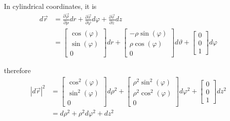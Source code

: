 \documentclass[11pt,a4paper]{article}
\begin{document}
\begin{enumerate}
In cylindrical coordinates, it is
\begin{align*}
d\vec{r}
&=\frac{\partial\vec{\rho}}{\partial \rho}dr+\frac{\partial\vec{r}}{\partial \varphi}d\varphi+\frac{\partial\vec{r}}{\partial z}dz \\
&=
\begin{bmatrix}
\cos(\varphi) \\
\sin(\varphi) \\
0
\end{bmatrix}
dr
+
\begin{bmatrix}
-\rho\sin(\varphi) \\
\rho\cos(\varphi) \\
0
\end{bmatrix}
d\vartheta
+
\begin{bmatrix}
0 \\
0 \\
1
\end{bmatrix}
d\varphi
\end{align*}

therefore
\begin{align*}
|d\vec{r}|^2
&=
\begin{bmatrix}
\cos^2(\varphi) \\
\sin^2(\varphi) \\
0
\end{bmatrix}
d\rho^2
+
\begin{bmatrix}
\rho^2\sin^2(\varphi) \\
\rho^2\cos^2(\varphi) \\
0
\end{bmatrix}
d\varphi^2
+
\begin{bmatrix}
0 \\
0 \\
1
\end{bmatrix}
dz^2 \\
&=d\rho^2+\rho^2d\varphi^2+dz^2
\end{align*}

\end{enumerate}

\newpage
\end{document}

